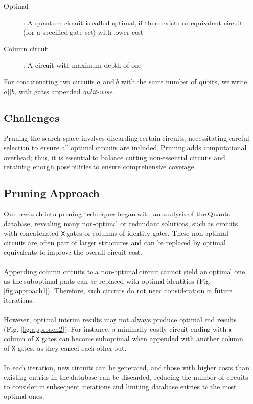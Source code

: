 \begin{description}
	\item[Optimal]: A quantum circuit is called optimal, if there exists no equivalent circuit (for a specified gate set) with lower cost
	
	\item[Column circuit]: A circuit with maximum depth of one
\end{description}

For concatenating two circuits $a$ and $b$ with the same number of qubits, we write $a||b$, with gates appended \textit{qubit-wise}.


\subsection{Challenges}
Pruning the search space involves discarding certain circuits, necessitating careful selection to ensure all optimal circuits are included. Pruning adds computational overhead; thus, it is essential to balance cutting non-essential circuits and retaining enough possibilities to ensure comprehensive coverage.

\subsection{Pruning Approach}
Our research into pruning techniques began with an analysis of the Quanto database, revealing many non-optimal or redundant solutions, such as circuits with concatenated \texttt{X} gates or columns of identity gates. These non-optimal circuits are often part of larger structures and can be replaced by optimal equivalents to improve the overall circuit cost.
\\\\
Appending column circuits to a non-optimal circuit cannot yield an optimal one, as the suboptimal parts can be replaced with optimal identities (Fig. \ref{fig:approach1}). Therefore, such circuits do not need consideration in future iterations.
\\\\
However, optimal interim results may not always produce optimal end results (Fig. \ref{fig:approach2}). For instance, a minimally costly circuit ending with a column of \texttt{X} gates can become suboptimal when appended with another column of \texttt{X} gates, as they cancel each other out.
\\\\
In each iteration, new circuits can be generated, and those with higher costs than existing entries in the database can be discarded, reducing the number of circuits to consider in subsequent iterations and limiting database entries to the most optimal ones.

